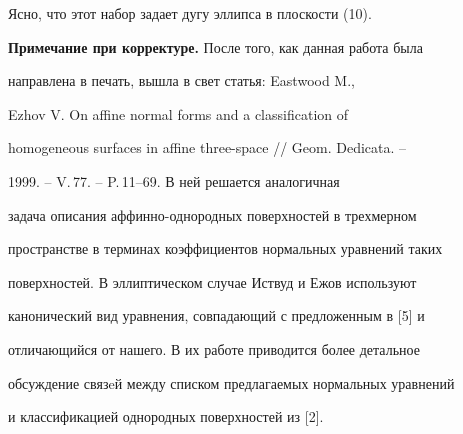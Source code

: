 Ясно, что этот набор задает дугу эллипса в плоскости (10).





{\bf Примечание при корректуре.} После того, как данная работа была


направлена в печать, вышла в свет статья: Eastwood M.,


Ezhov V. On affine normal forms and a classification of


homogeneous surfaces in affine three-space // Geom. Dedicata. --


1999. -- V.\,77. -- P.\,11--69. В ней решается аналогичная


задача описания аффинно-однородных поверхностей в трехмерном


пространстве в терминах коэффициентов нормальных уравнений таких


поверхностей. В эллиптическом случае Иствуд и Ежов используют


канонический вид уравнения, совпадающий с предложенным в [5] и


отличающийся от нашего. В их работе приводится более детальное


обсуждение связeй между списком предлагаемых нормальных уравнений


и классификацией однородных поверхностей из [2].






